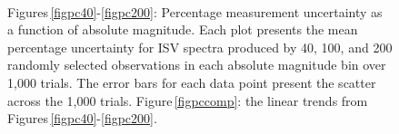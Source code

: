 \begin{figure}
	\captionsetup{width=.8\textwidth}
    \\
    \caption{Figures\,\ref{figpc40}-\ref{figpc200}: Percentage measurement uncertainty as a function of absolute magnitude. Each plot presents the mean percentage uncertainty for ISV spectra produced by 40, 100, and 200 randomly selected observations in each absolute magnitude bin over 1,000 trials. The error bars for each data point present the scatter across the 1,000 trials. Figure\,\ref{figpccomp}: the linear trends from Figures\,\ref{figpc40}-\ref{figpc200}.}
    \label{figGALAHpcerr}
\end{figure}

